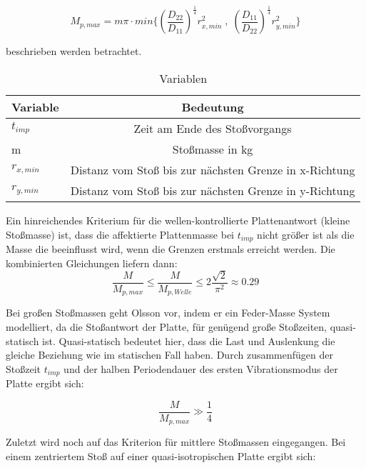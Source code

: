 \begin{equation}
	M_{p,max} = m \pi \cdot min\{(\frac{D_{22}}{D_{11}})^{\frac{1}{4}} r_{x,min}^{2} \; , \; (\frac{D_{11}}{D_{22}})^{\frac{1}{4}} r_{y,min}^{2} \}
\end{equation}		
		
beschrieben werden betrachtet. 

\begin{table}[h!]
	\begin{center}
		\caption{Variablen}
		\label{tab:Tabelle 2}
		\begin{tabular}{l|c}
			\textbf{Variable} & \textbf{Bedeutung}\\
			\hline
			$t_{imp}$ & Zeit am Ende des Stoßvorgangs\\
			m & Stoßmasse in kg\\
			$r_{x,min}$ & Distanz vom Stoß bis zur nächsten Grenze in x-Richtung\\
			$r_{y,min}$ & Distanz vom Stoß bis zur nächsten Grenze in y-Richtung\\
		\end{tabular}
	\end{center}
\end{table}

Ein hinreichendes Kriterium für die wellen-kontrollierte Plattenantwort (kleine Stoßmasse) ist, dass die affektierte Plattenmasse bei $t_{imp}$ nicht größer ist als die Masse die beeinflusst wird, wenn die Grenzen erstmals erreicht werden. Die kombinierten Gleichungen liefern dann: 
\begin{equation}
	\frac{M}{M_{p,max}} \leq \frac{M}{M_{p,Welle}} \leq 2 \frac{\sqrt{2}}{\pi^{2}} \approx 0.29
\end{equation}

Bei großen Stoßmassen geht Olsson vor, indem er ein Feder-Masse System modelliert, da die Stoßantwort der Platte, für genügend große Stoßzeiten, quasi-statisch ist. Quasi-statisch bedeutet hier, dass die Last und Auslenkung die gleiche Beziehung wie im statischen Fall haben. Durch zusammenfügen der Stoßzeit $t_{imp}$ und der halben Periodendauer des ersten Vibrationsmodus der Platte ergibt sich: 

\begin{equation}
	\frac{M}{M_{p,max}} \gg \frac{1}{4}
\end{equation}

Zuletzt wird noch auf das Kriterion für mittlere Stoßmassen eingegangen. Bei einem zentriertem Stoß auf einer quasi-isotropischen Platte ergibt sich:

